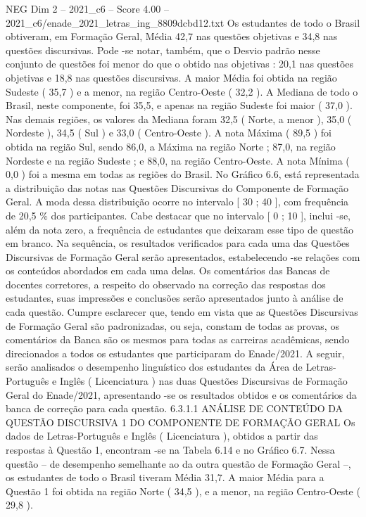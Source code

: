 \begin{textsample}{NEG Dim 2 – 2021\_c6 – Score 4.00 – 2021\_c6/enade\_2021\_letras\_ing\_8809dcbd12.txt}
Os estudantes de todo o Brasil obtiveram, em Formação Geral, Média 42,7 nas questões objetivas e 34,8 nas questões discursivas.
Pode -se notar, também, que o Desvio padrão nesse conjunto de questões foi menor do que o obtido nas objetivas : 20,1 nas questões objetivas e 18,8 nas questões discursivas.
A maior Média foi obtida na região Sudeste ( 35,7 ) e a menor, na região Centro-Oeste ( 32,2 ).
A Mediana de todo o Brasil, neste componente, foi 35,5, e apenas na região Sudeste foi maior ( 37,0 ).
Nas demais regiões, os valores da Mediana foram 32,5 ( Norte, a menor ), 35,0 ( Nordeste ), 34,5 ( Sul ) e 33,0 ( Centro-Oeste ).
A nota Máxima ( 89,5 ) foi obtida na região Sul, sendo 86,0, a Máxima na região Norte ; 87,0, na região Nordeste e na região Sudeste ; e 88,0, na região Centro-Oeste.
A nota Mínima ( 0,0 ) foi a mesma em todas as regiões do Brasil.
No Gráfico 6.6, está representada a distribuição das notas nas Questões Discursivas do Componente de Formação Geral.
A moda dessa distribuição ocorre no intervalo [ 30 ; 40 ], com frequência de 20,5 \% dos participantes.
Cabe destacar que no intervalo [ 0 ; 10 ], inclui -se, além da nota zero, a frequência de estudantes que deixaram esse tipo de questão em branco.
Na sequência, os resultados verificados para cada uma das Questões Discursivas de Formação Geral serão apresentados, estabelecendo -se relações com os conteúdos abordados em cada uma delas.
Os comentários das Bancas de docentes corretores, a respeito do observado na correção das respostas dos estudantes, suas impressões e conclusões serão apresentados junto à análise de cada questão.
Cumpre esclarecer que, tendo em vista que as Questões Discursivas de Formação Geral são padronizadas, ou seja, constam de todas as provas, os comentários da Banca são os mesmos para todas as carreiras acadêmicas, sendo direcionados a todos os estudantes que participaram do Enade/2021.
A seguir, serão analisados o desempenho linguístico dos estudantes da Área de Letras-Português e Inglês ( Licenciatura ) nas duas Questões Discursivas de Formação Geral do Enade/2021, apresentando -se os resultados obtidos e os comentários da banca de correção para cada questão. 6.3.1.1 ANÁLISE DE CONTEÚDO DA QUESTÃO DISCURSIVA 1 DO COMPONENTE DE FORMAÇÃO GERAL Os dados de Letras-Português e Inglês ( Licenciatura ), obtidos a partir das respostas à Questão 1, encontram -se na Tabela 6.14 e no Gráfico 6.7.
Nessa questão – de desempenho semelhante ao da outra questão de Formação Geral –, os estudantes de todo o Brasil tiveram Média 31,7.
A maior Média para a Questão 1 foi obtida na região Norte ( 34,5 ), e a menor, na região Centro-Oeste ( 29,8 ).

\end{textsample}
